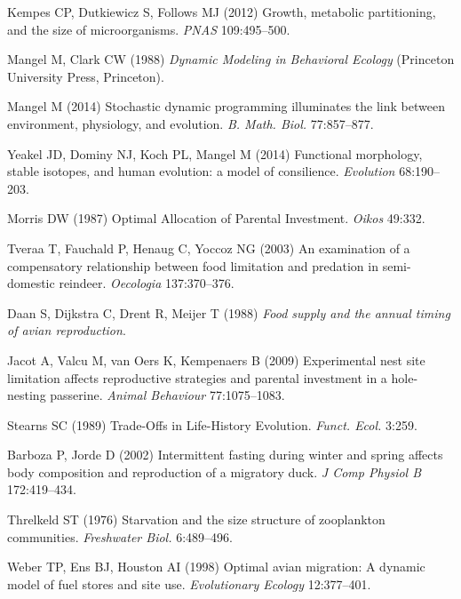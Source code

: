 \documentclass{pnastwo}
\begin{document}
\begin{article}
\begin{thebibliography}{10}
Kempes CP, Dutkiewicz S, Follows MJ
\newblock (2012) {Growth, metabolic partitioning, and the size of
  microorganisms.}
\newblock \emph{PNAS} 109:495--500.

Mangel M, Clark CW
\newblock (1988) \emph{{Dynamic Modeling in Behavioral Ecology}}
\newblock (Princeton University Press, Princeton).

Mangel M
\newblock (2014) {Stochastic dynamic programming illuminates the link between
  environment, physiology, and evolution}.
\newblock \emph{B. Math. Biol.} 77:857--877.

Yeakel JD, Dominy NJ, Koch PL, Mangel M
\newblock (2014) {Functional morphology, stable isotopes, and human evolution:
  a model of consilience}.
\newblock \emph{Evolution} 68:190--203.

Morris DW
\newblock (1987) {Optimal Allocation of Parental Investment}.
\newblock \emph{Oikos} 49:332.

Tveraa T, Fauchald P, Henaug C, Yoccoz NG
\newblock (2003) {An examination of a compensatory relationship between food
  limitation and predation in semi-domestic reindeer}.
\newblock \emph{Oecologia} 137:370--376.

Daan S, Dijkstra C, Drent R, Meijer T
\newblock (1988) \emph{{Food supply and the annual timing of avian
  reproduction}}.

Jacot A, Valcu M, van Oers K, Kempenaers B
\newblock (2009) {Experimental nest site limitation affects reproductive
  strategies and parental investment in a hole-nesting passerine}.
\newblock \emph{Animal Behaviour} 77:1075--1083.

Stearns SC
\newblock (1989) {Trade-Offs in Life-History Evolution}.
\newblock \emph{Funct. Ecol.} 3:259.

Barboza P, Jorde D
\newblock (2002) {Intermittent fasting during winter and spring affects body
  composition and reproduction of a migratory duck}.
\newblock \emph{J Comp Physiol B} 172:419--434.

Threlkeld ST
\newblock (1976) {Starvation and the size structure of zooplankton
  communities}.
\newblock \emph{Freshwater Biol.} 6:489--496.

Weber TP, Ens BJ, Houston AI
\newblock (1998) {Optimal avian migration: A dynamic model of fuel stores and
  site use}.
\newblock \emph{Evolutionary Ecology} 12:377--401.


\end{thebibliography}
\end{article}
\end{document}
